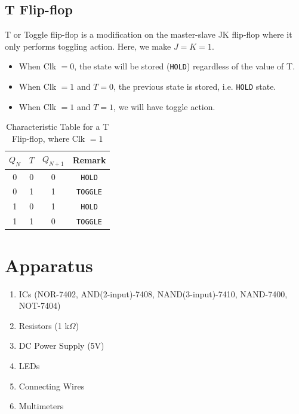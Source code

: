 \subsection*{T Flip-flop}
T or Toggle flip-flop is a  modification on the master-slave JK flip-flop where it only performs toggling action. Here, we make $J=K=1$.
\begin{itemize}
    \item When Clk $=0$, the state will be stored (\verb|HOLD|) regardless of the value of T.
    \item When Clk $=1$ and $T=0$, the previous state is stored, i.e. \verb|HOLD| state.
    \item When Clk $=1$ and $T=1$, we will have toggle action.\\
\end{itemize} 

\begin{table}[H]
    \centering
    \begin{tabular}{|c|c|c|c|}\hline
        $Q_N$ & $T$ & $Q_{N+1}$ & Remark\\ \hline
        0 & 0 & 0 & \verb|HOLD| \\ 
        0 & 1 & 1 & \verb|TOGGLE| \\ 
        1 & 0 & 1 & \verb|HOLD| \\ 
        1 & 1 & 0 & \verb|TOGGLE|\\ \hline
    \end{tabular}
    \caption{Characteristic Table for a T Flip-flop, where Clk $=1$}
\end{table}
\section{Apparatus}

\begin{enumerate}
    \item ICs (NOR-7402, AND(2-input)-7408, NAND(3-input)-7410, NAND-7400, NOT-7404)
    \item Resistors (1 k$\Omega$)
    \item DC Power Supply (5V)
    \item LEDs
    \item Connecting Wires
    \item Multimeters
\end{enumerate}
